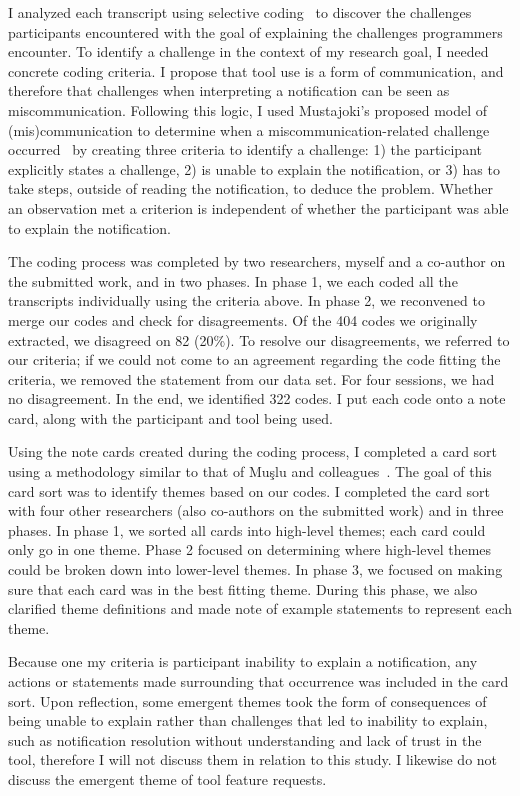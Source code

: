 \documentclass{llncs}
\begin{document}
I analyzed each transcript using selective coding~\cite{corbin2014basics} to discover the challenges participants encountered with the goal of explaining the challenges programmers encounter. 
To identify a challenge in the context of my research goal, I needed concrete coding criteria. I propose that tool use is a form of communication, and therefore that challenges when interpreting a notification can be seen as miscommunication. Following this logic, I used Mustajoki's proposed model of (mis)communication to determine when a miscommunication-related challenge occurred~\cite{mustajoki2008modelling} by creating three criteria to identify a challenge: 1) the participant explicitly states a challenge, 2) is unable to explain the notification, or 3) has to take steps, outside of reading the notification, to deduce the problem.
Whether an observation met a criterion is independent of whether the participant was able to explain the notification.

The coding process was completed by two researchers, myself and a co-author on the submitted work, and in two phases. In phase 1, we each coded all the transcripts individually using the criteria above. In phase 2, we reconvened to merge our codes and check for disagreements. Of the 404 codes we originally extracted, we disagreed on 82 (20\%). 
To resolve our disagreements, we referred to our criteria; if we could not come to an agreement regarding the code fitting the criteria, we removed the statement from our data set. For four sessions, we had no disagreement.
In the end, we identified 322 codes. I put each code onto a note card, along with the participant and tool being used. 

Using the note cards created during the coding process, I completed a card sort using a methodology similar to that of Mu\c{s}lu and colleagues~\cite{Muslu:2014:Transition}. 
The goal of this card sort was to identify themes based on our codes. 
I completed the card sort with four other researchers (also co-authors on the submitted work) and in three phases.
In phase 1, we sorted all cards into high-level themes; each card could only go in one theme. 
Phase 2 focused on determining where high-level themes could be broken down into lower-level themes.
In phase 3, we focused on making sure that each card was in the best fitting theme. During this phase, we also clarified theme definitions and made note of example statements to represent each theme.

Because one my criteria is participant inability to explain a notification, any actions or statements made surrounding that occurrence was included in the card sort. Upon reflection, some emergent themes took the form of consequences of being unable to explain rather than challenges that led to inability to explain, such as notification resolution without understanding and lack of trust in the tool, therefore I will not discuss them in relation to this study. I likewise do not discuss the emergent theme of tool feature requests.
\end{document}
